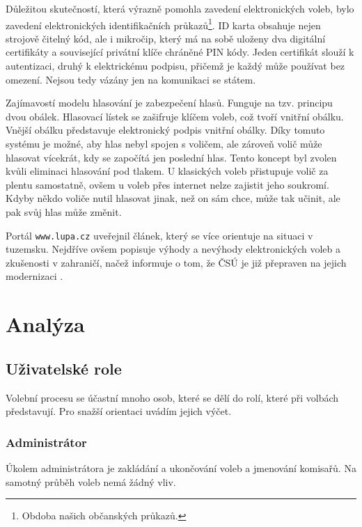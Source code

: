 \documentclass[11pt,twoside,a4paper]{book}
\begin{document}
Důležitou skutečností, která výrazně pomohla zavedení elektronických voleb, bylo zavedení elektronických identifikačních průkazů\footnote{Obdoba našich občanských průkazů.}. ID karta obsahuje nejen strojově čitelný kód, ale i mikročip, který má na sobě uloženy dva digitální certifikáty a související privátní klíče chráněné PIN kódy. Jeden certifikát slouží k autentizaci, druhý k elektrickému podpisu, přičemž je každý může používat bez omezení. Nejsou tedy vázány jen na komunikaci se státem.

Zajímavostí modelu hlasování je zabezpečení hlasů. Funguje na tzv. principu dvou obálek. Hlasovací lístek se zašifruje klíčem voleb, což tvoří vnitřní obálku. Vnější obálku představuje elektronický podpis vnitřní obálky. Díky tomuto systému je možné, aby hlas nebyl spojen s voličem, ale zároveň volič může hlasovat vícekrát, kdy se započítá jen poslední hlas. Tento koncept byl zvolen kvůli eliminaci hlasování pod tlakem. U klasických voleb přistupuje volič za plentu samostatně, ovšem u voleb přes internet nelze zajistit jeho soukromí. Kdyby někdo voliče nutil hlasovat jinak, než on sám chce, může tak učinit, ale pak svůj hlas může změnit.

Portál \texttt{www.lupa.cz} \cite{www:lupa} uveřejnil článek, který se více orientuje na situaci v tuzemsku. Nejdříve ovšem popisuje výhody a nevýhody elektronických voleb a zkušenosti v zahraničí, načež informuje o tom, že ČSÚ je již přepraven na jejich modernizaci \cite{www:csu}. 

\chapter{Analýza}

\section{Uživatelské role}

Volební procesu se účastní mnoho osob, které se dělí do rolí, které při volbách představují. Pro snažší orientaci uvádím jejich výčet.

\subsection{Administrátor}

Úkolem administrátora je zakládání a ukončování voleb a jmenování komisařů. Na samotný průběh voleb nemá žádný vliv. 
\end{document}
